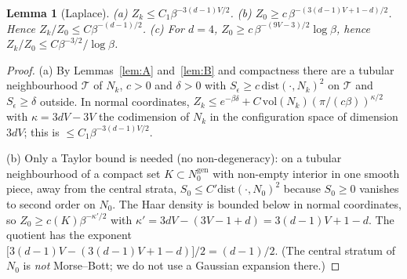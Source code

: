 \documentclass[11pt,a4paper]{article}
\theoremstyle{plain}
\newtheorem{lemma}[theorem]{Lemma}
\theoremstyle{definition}
\theoremstyle{remark}
\numberwithin{equation}{section}
\begin{document}
\begin{lemma}[Laplace]\label{lem:C}
(a) $Z_k\le C_1\beta^{-3(d-1)V/2}$. (b) $Z_0\ge c\,\beta^{-(3(d-1)V+1-d)/2}$. Hence $Z_k/Z_0\le C\beta^{-(d-1)/2}$. (c) For $d=4$, $Z_0\ge c\,\beta^{-(9V-3)/2}\log\beta$, hence $Z_k/Z_0\le C\beta^{-3/2}/\log\beta$.
\end{lemma}
\begin{proof}
(a) By Lemmas~\ref{lem:A} and~\ref{lem:B} and compactness there are a tubular neighbourhood $\mathcal T$ of $N_k$, $c>0$ and $\delta>0$ with $S_\epsilon\ge c\,\mathrm{dist}(\cdot,N_k)^2$ on $\mathcal T$ and $S_\epsilon\ge\delta$ outside. In normal coordinates, $Z_k\le e^{-\beta\delta}+C\,\mathrm{vol}(N_k)(\pi/(c\beta))^{\kappa/2}$ with $\kappa=3dV-3V$ the codimension of $N_k$ in the configuration space of dimension $3dV$; this is $\le C_1\beta^{-3(d-1)V/2}$.

(b) Only a Taylor bound is needed (no non-degeneracy): on a tubular neighbourhood of a compact set $K\subset N_0^{\mathrm{gen}}$ with non-empty interior in one smooth piece, away from the central strata, $S_0\le C'\mathrm{dist}(\cdot,N_0)^2$ because $S_0\ge0$ vanishes to second order on $N_0$. The Haar density is bounded below in normal coordinates, so $Z_0\ge c(K)\beta^{-\kappa'/2}$ with $\kappa'=3dV-(3V-1+d)=3(d-1)V+1-d$. The quotient has the exponent $\bigl[3(d-1)V-(3(d-1)V+1-d)\bigr]/2=(d-1)/2$. (The central stratum of $N_0$ is \emph{not} Morse--Bott; we do not use a Gaussian expansion there.)


\end{proof}
\end{document}
